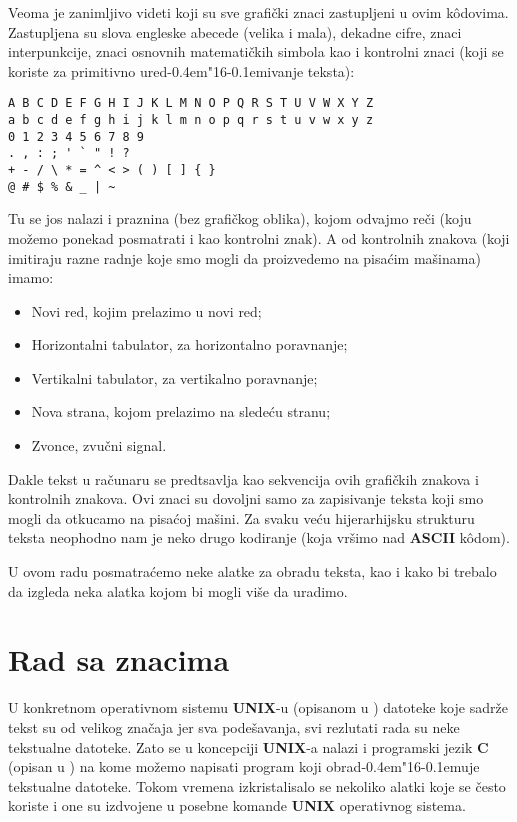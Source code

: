 \documentclass[12pt,a4paper]{article}
\def\d{d\kern-0.4em\char"16\kern-0.1em}
\begin{document}
    Veoma je zanimljivo videti koji su sve grafi\v cki znaci zastupljeni u
    ovim k\^odovima.
    Zastupljena su slova engleske abecede (velika i mala), dekadne cifre,
    znaci interpunkcije, znaci osnovnih matemati\v ckih simbola kao i
    kontrolni znaci (koji se koriste za primitivno ure\d ivanje teksta):
    \begin{verbatim}
A B C D E F G H I J K L M N O P Q R S T U V W X Y Z
a b c d e f g h i j k l m n o p q r s t u v w x y z
0 1 2 3 4 5 6 7 8 9
. , : ; ' ` " ! ?
+ - / \ * = ^ < > ( ) [ ] { }
@ # $ % & _ | ~
\end{verbatim}
    Tu se jos nalazi i praznina (bez grafi\v ckog oblika), kojom odvajmo
    re\v ci (koju mo\v zemo ponekad posmatrati i kao kontrolni znak).
    A od kontrolnih znakova (koji imitiraju razne radnje koje smo mogli da
    proizvedemo na pisa\'cim ma\v si\-nama) imamo:
    \begin{itemize}
    \item
      Novi red, kojim prelazimo u novi red;
    \item
      Horizontalni tabulator, za horizontalno poravnanje;
    \item
      Vertikalni tabulator, za vertikalno poravnanje;
    \item
      Nova strana, kojom prelazimo na slede\'cu stranu;
    \item
      Zvonce, zvu\v cni signal.
    \end{itemize}

    Dakle tekst u ra\v cunaru se predtsavlja kao sekvencija ovih grafi\v ckih
    znako\-va i kontrolnih znakova.
    Ovi znaci su dovoljni samo za zapisivanje teksta koji smo mogli da
    otkucamo na pisa\'coj ma\v sini.
    Za svaku ve\'cu hijerarhijsku strukturu teksta neophodno nam je neko drugo
    kodiranje (koja vr\v simo nad {\bf ASCII} k\^odom).

    U ovom radu posmatra\'cemo neke alatke za obradu teksta, kao i kako bi
    trebalo da izgleda neka alatka kojom bi mogli vi\v se da uradimo.
%
%
  \newpage
  \section{Rad sa znacima}
    U konkretnom operativnom sistemu {\bf UNIX}-u (opisanom u \cite{UNIX})
    datoteke koje sadr\v ze tekst su od velikog zna\v caja jer sva
    pode\v savanja, svi rezlutati rada su neke tekstualne datoteke.
    Zato se u koncepciji {\bf UNIX}-a nalazi i programski jezik {\bf C}
    (opisan u \cite{KR}) na kome mo\v zemo napisati program koji obra\d uje
    tekstualne datoteke.
    Tokom vremena izkristalisalo se nekoliko alatki koje se \v cesto koriste i
    one su izdvojene u posebne komande {\bf UNIX} operativnog sistema.
\end{document}
